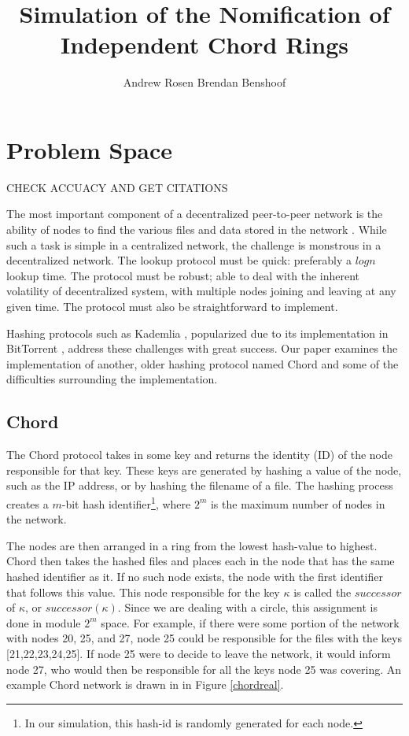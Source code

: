 \documentclass[12pt]{ieeetran} %
\title{Simulation of the Nomification of Independent Chord Rings}
\author{Andrew Rosen \qquad Brendan Benshoof }
\date{} %
\begin{document}
\maketitle
\newpage
\section{Problem Space}

CHECK ACCUACY AND GET CITATIONS

The most important component of a decentralized peer-to-peer network is the ability of nodes to find the various files and data stored in the network \cite{Chord}.  While such a task is simple in a centralized network, the challenge is monstrous in a decentralized network.  The lookup protocol must be quick:  preferably a $log n$ lookup time.  The protocol must be robust; able to deal with the inherent volatility of decentralized system, with multiple nodes joining and leaving at any given time.  The protocol must also be straightforward to implement.

Hashing protocols such as Kademlia \cite{Kademlia}, popularized due to its implementation in BitTorrent \cite{BitTorrent}, address these challenges with great success.  Our paper examines the implementation of another, older hashing protocol named Chord \cite{Chord} and some of the difficulties surrounding the implementation.
\subsection{Chord}

The Chord protocol \cite{Chord} takes in some key and returns the identity (ID) of the node responsible for that key.  These keys are generated by hashing a value of the node, such as the IP address, or by hashing  the filename of a file.  The hashing process creates a $m$-bit hash identifier\footnote{In our simulation, this hash-id is randomly generated for each node.}, where $2^m$ is the maximum number of nodes in the network.

The nodes are then arranged in a ring from the lowest hash-value to highest.  Chord then takes the hashed files and places each in the node that has the same hashed identifier as it.  If no such node exists, the node with the first identifier that follows this value.  This node responsible for the key $\kappa$ is called the $successor$ of $\kappa$, or $successor(\kappa)$.  Since we are dealing with a circle, this assignment is done in module $2^m$ space.  For example, if there were some portion of the network with nodes 20, 25, and 27, node 25 could be responsible for the files with the keys [21,22,23,24,25]. If node 25 were to decide to leave the network, it would inform node 27, who would then be responsible for all the keys node 25 was covering. An example Chord network is drawn in in Figure \ref{chordreal}.
\end{document}
